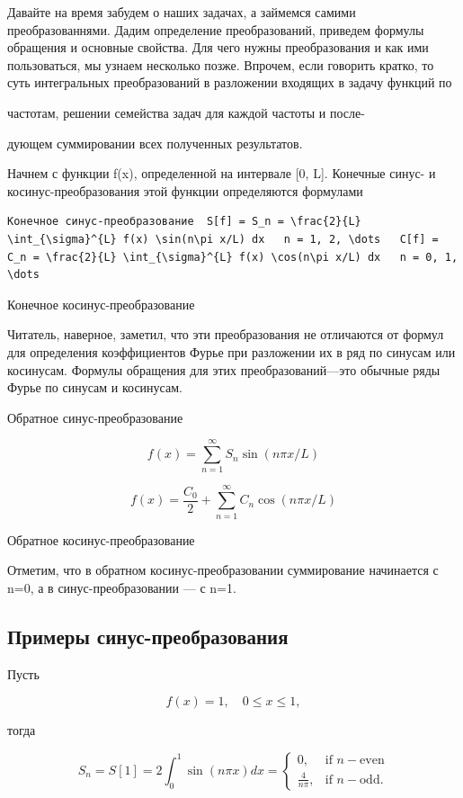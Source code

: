 \documentclass[
  ukrainian,
]{article}
\begin{document}
Давайте на время забудем о наших задачах, а займемся самими
преобразованнями. Дадим определение преобразований, приведем формулы
обращения и основные свойства. Для чего нужны преобразования и как ими
пользоваться, мы узнаем несколько позже. Впрочем, если говорить кратко,
то суть интегральных преобразований в разложении входящих в задачу
функций по

частотам, решении семейства задач для каждой частоты и после-

дующем суммировании всех полученных результатов.

Начнем с функции f(x), определенной на интервале {[}0, L{]}. Конечные
синус- и косинус-преобразования этой функции определяются формулами

\begin{verbatim}
Конечное синус-преобразование  S[f] = S_n = \frac{2}{L} \int_{\sigma}^{L} f(x) \sin(n\pi x/L) dx   n = 1, 2, \dots   C[f] = C_n = \frac{2}{L} \int_{\sigma}^{L} f(x) \cos(n\pi x/L) dx   n = 0, 1, \dots
\end{verbatim}

Конечное косинус-преобразование

Читатель, наверное, заметил, что эти преобразования не отличаются от
формул для определения коэффициентов Фурье при разложении их в ряд по
синусам или косинусам. Формулы обращения для этих преобразований---это
обычные ряды Фурье по синусам и косинусам.

Обратное синус-преобразование

\[
f(x) = \sum_{n=1}^{\infty} S_n \sin(n\pi x/L)
\]

\[
f(x) = \frac{C_0}{2} + \sum_{n=1}^{\infty} C_n \cos(n\pi x/L)
\]

Обратное косинус-преобразование

Отметим, что в обратном косинус-преобразовании суммирование начинается с
n=0, а в синус-преобразовании --- с n=1.

\subsection{Примеры
синус-преобразования}\label{ux43fux440ux438ux43cux435ux440ux44b-ux441ux438ux43dux443ux441-ux43fux440ux435ux43eux431ux440ux430ux437ux43eux432ux430ux43dux438ux44f}

Пусть

\[
f(x) = 1, \quad 0 \le x \le 1,
\]

тогда

\[
S_n = S[1] = 2 \int_0^1 \sin(n\pi x) dx = \begin{cases} 0, & \text{if } n - \text{even} \\ \frac{4}{n\pi}, & \text{if } n - \text{odd.} \end{cases}
\]
\end{document}
